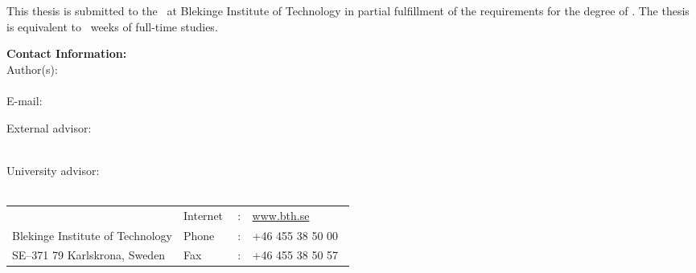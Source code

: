 {
	\setlength{\parindent}{0pt}
	\changepage{5cm}{1cm}{-0.5cm}{-0.5cm}{}{-2cm}{}{}{} %

	\begin{small}
		This thesis is submitted to the \bthdissdept\ at Blekinge Institute of Technology in partial fulfillment of the requirements for the degree of \bthdissdegree . The thesis is equivalent to \bthdissnumweeks\ weeks of full-time studies.
	\end{small}

	\vfill %

	\textbf{Contact Information:}\\
	Author(s):\\
	\bthdissfirstname\ \bthdisslastname \\
	E-mail: \bthdissemail 

	\bigskip

	External advisor: \\
	\bthdissadvisorext \\
	\bthdissadvisorextorg 

	\bigskip

	University advisor:\\
	\bthdissadvisoruni \\
	\bthdissdept

	\vfill

	\begin{tabular}{p{0.5\linewidth}lcl}
		\bthdissdept						& Internet	& : & \href{http://www.bth.se}{www.bth.se}\\
		Blekinge Institute of Technology	& Phone		& : & +46 455 38 50 00\\
		SE--371 79 Karlskrona, Sweden		& Fax		& : & +46 455 38 50 57\\
	\end{tabular}

	\bigskip \bigskip \bigskip %

	\clearpage
}

\pagestyle{plain}
\setcounter{page}{1}
